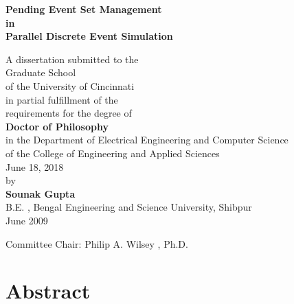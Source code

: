 \documentclass[11pt]{book}
\begin{document}
\raggedbottom

\thispagestyle{empty}

\doublespacing

\begin{center}
\textbf{
\LARGE  Pending Event Set Management\\
        in\\
        Parallel Discrete Event Simulation\\
}

\vspace*{0.4in}

{\large A dissertation submitted to the\\[0.20in]
        Graduate School\\
        of the University of Cincinnati\\[0.20in]
        in partial fulfillment of the\\
        requirements for the degree of\\[0.20in]
        \textbf{\Large Doctor of Philosophy}\\[0.20in]
        in the Department of Electrical Engineering and Computer Science\\
        of the College of Engineering and Applied Sciences\\[0.20in]
        June 18, 2018\\[0.20in]
        by\\[0.20in]
        \textbf{Sounak Gupta}\\
        B.E. , Bengal Engineering and Science University, Shibpur\\
        June 2009\\
}

\vspace{0.4in}
{\large Committee Chair:  Philip A. Wilsey , Ph.D.}

\end{center}

\clearpage

\setcounter{page}{1}

\clearpage
\chapter*{Abstract}\label{chapter:abstract}
\end{document}

